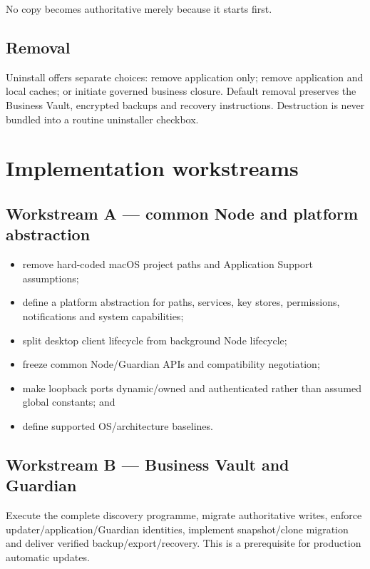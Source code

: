 \documentclass[11pt]{article}
\begin{document}
No copy becomes authoritative merely because it starts first.

\subsection{Removal}

Uninstall offers separate choices: remove application only; remove application and local caches; or initiate governed business closure. Default removal preserves the Business Vault, encrypted backups and recovery instructions. Destruction is never bundled into a routine uninstaller checkbox.

\section{Implementation workstreams}

\subsection{Workstream A --- common Node and platform abstraction}

\begin{itemize}
  \item remove hard-coded macOS project paths and Application Support assumptions;
  \item define a platform abstraction for paths, services, key stores, permissions, notifications and system capabilities;
  \item split desktop client lifecycle from background Node lifecycle;
  \item freeze common Node/Guardian APIs and compatibility negotiation;
  \item make loopback ports dynamic/owned and authenticated rather than assumed global constants; and
  \item define supported OS/architecture baselines.
\end{itemize}

\subsection{Workstream B --- Business Vault and Guardian}

Execute the complete discovery programme, migrate authoritative writes, enforce updater/application/Guardian identities, implement snapshot/clone migration and deliver verified backup/export/recovery. This is a prerequisite for production automatic updates.
\end{document}
